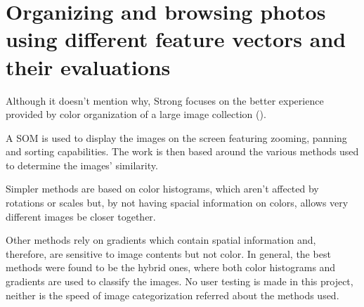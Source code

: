 \section{Organizing and browsing photos using different feature vectors and their evaluations} %
\label{sub:Strong}

Although it doesn't mention why, Strong \cite{Strong:2009p413} focuses on the better experience provided by color organization of a large image collection ().

A \ac{SOM} is used to display the images on the screen featuring zooming, panning and sorting capabilities. The work is then based around the various methods used to determine the images' similarity.

Simpler methods are based on color histograms, which aren't affected by rotations or scales but, by not having spacial information on colors, allows very different images be closer together.

Other methods rely on gradients which contain spatial information and, therefore, are sensitive to image contents but not color.
In general, the best methods were found to be the hybrid ones, where both color histograms and gradients are used to classify the images.
No user testing is made in this project, neither is the speed of image categorization referred about the methods used.

